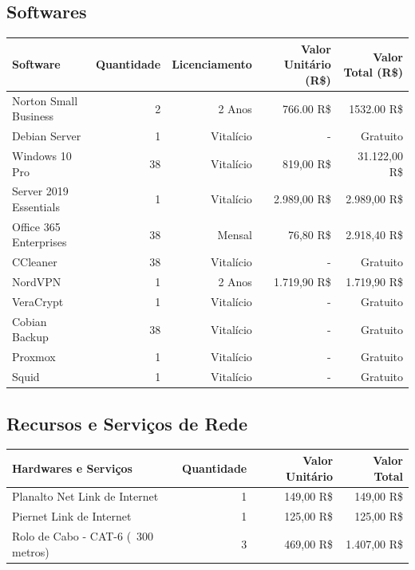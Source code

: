 \documentclass[12pt]{article}
\begin{document}
\subsection{Softwares}
\begin{center}
\begin{tabular}{| l | r | r | r | r |}
\hline 
Software & Quantidade & Licenciamento & Valor Unitário (R\$) & Valor Total (R\$)\\
\hline
Norton Small Business & 2 & 2 Anos & 766.00 R\$ & 1532.00 R\$\\
Debian Server & 1 & Vitalício & - & Gratuito\\
Windows 10 Pro & 38 & Vitalício & 819,00 R\$ & 31.122,00 R\$\\
Server 2019 Essentials & 1 & Vitalício & 2.989,00 R\$ & 2.989,00 R\$\\
Office 365 Enterprises & 38 & Mensal & 76,80 R\$ & 2.918,40 R\$\\
CCleaner & 38 & Vitalício & - & Gratuito\\
NordVPN & 1 & 2 Anos & 1.719,90 R\$ & 1.719,90 R\$\\
VeraCrypt & 1 & Vitalício & - & Gratuito\\
Cobian Backup & 38 & Vitalício & - & Gratuito\\
Proxmox & 1 & Vitalício & - & Gratuito\\
Squid & 1 & Vitalício  & - & Gratuito\\
\hline
\end{tabular}
\end{center}
\subsection{Recursos e Serviços de Rede}
\begin{center}
\begin{tabular}{| l | r | r | r |}
\hline 
Hardwares e Serviços & Quantidade & Valor Unitário & Valor Total\\
\hline
Planalto Net Link de Internet & 1 & 149,00 R\$ & 149,00 R\$\\
Piernet Link de Internet & 1 & 125,00 R\$ & 125,00 R\$\\
Rolo de Cabo - CAT-6 (~300 metros) & 3 & 469,00 R\$ & 1.407,00 R\$\\
\hline
\end{tabular}
\end{center}
\end{document}
